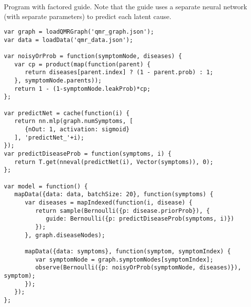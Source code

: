 Program with factored guide. Note that the guide uses a separate neural network (with separate parameters) to predict each latent cause.
\begin{lstlisting}
var graph = loadQMRGraph('qmr_graph.json');
var data = loadData('qmr_data.json');

var noisyOrProb = function(symptomNode, diseases) {
   var cp = product(map(function(parent) {
      return diseases[parent.index] ? (1 - parent.prob) : 1;
   }, symptomNode.parents));
   return 1 - (1-symptomNode.leakProb)*cp;
};

var predictNet = cache(function(i) {
   return nn.mlp(graph.numSymptoms, [
      {nOut: 1, activation: sigmoid}
   ], 'predictNet_'+i);
});
var predictDiseaseProb = function(symptoms, i) {
   return T.get(nneval(predictNet(i), Vector(symptoms)), 0);
};

var model = function() {
   mapData({data: data, batchSize: 20}, function(symptoms) {
      var diseases = mapIndexed(function(i, disease) {
         return sample(Bernoulli({p: disease.priorProb}), {
            guide: Bernoulli({p: predictDiseaseProb(symptoms, i)})
         });
      }, graph.diseaseNodes);

      mapData({data: symptoms}, function(symptom, symptomIndex) {
         var symptomNode = graph.symptomNodes[symptomIndex];
         observe(Bernoulli({p: noisyOrProb(symptomNode, diseases)}), symptom);
      });
   });
};
\end{lstlisting}

